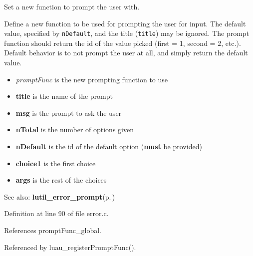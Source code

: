 Set a new function to prompt the user with. 

Define a new function to be used for prompting the user for input. The default value, specified by {\tt n\-Default}, and the title ({\tt title}) may be ignored. The prompt function should return the id of the value picked (first = 1, second = 2, etc.). Default behavior is to not prompt the user at all, and simply return the default value.

\begin{itemize}
\item {\em prompt\-Func\/} is the new prompting function to use \item {\bf title} is the name of the prompt \item {\bf msg} is the prompt to ask the user \item {\bf n\-Total} is the number of options given \item {\bf n\-Default} is the id of the default option ({\bf must} be provided) \item {\bf choice1} is the first choice \item {\bf args} is the rest of the choices\end{itemize}
\begin{Desc}
\item[See also:]{\bf lutil\_\-error\_\-prompt}{\rm (p.\,\pageref{error_8h_a8})} \end{Desc}


Definition at line 90 of file error.c.

References prompt\-Func\_\-global.

Referenced by luau\_\-register\-Prompt\-Func().